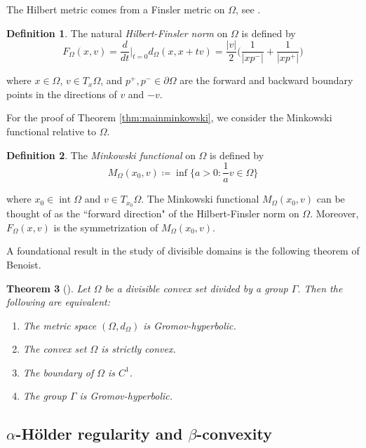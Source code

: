 \documentclass[letterpaper, 11pt, reqno]{amsart}
\newtheorem{thm}{Theorem}[section]
\theoremstyle{definition}
\newtheorem{dfn}[thm]{Definition}
\DeclareMathOperator{\interior}{int}
\begin{document}
The Hilbert metric comes from a Finsler metric on $\Omega$, see \cite{Marquis}.

\begin{dfn}\label{def:finsler} The natural \textit{Hilbert-Finsler norm} on $\Omega$ is defined by
    \begin{equation}
            F_\Omega(x,v) = \frac{d}{dt} \biggr\rvert_{t = 0} d_\Omega (x, x+tv) = \frac{|v|}{2} \bigg( \frac{1}{|xp^-|} + \frac{1}{|xp^+|} \bigg)
\end{equation}

where $x \in \Omega$, $v \in T_x \Omega$, and $p^+, p^- \in \partial\Omega$ are the forward and backward boundary points in the directions of $v$ and $-v$.
\end{dfn}


For the proof of Theorem \ref{thm:mainminkowski}, we consider the Minkowski functional relative to $\Omega$.

\begin{dfn}\label{dfn:minkowski} The \textit{Minkowski functional} on $\Omega$ is defined by
\begin{equation}\label{equation:minfun}
    M_\Omega(x_0,v) \coloneq \inf \biggl\{a > 0: \frac{1}{a}v \in \Omega \biggr\}
\end{equation}
\end{dfn}
where $x_0 \in \interior \Omega$ and $v \in T_{x_0}\Omega$. The Minkowski functional $M_\Omega(x_0,v)$ can be thought of as the ``forward direction" of the Hilbert-Finsler norm on $\Omega$. Moreover, $F_\Omega(x,v)$ is the symmetrization of $M_\Omega(x_0, v)$.

A foundational result in the study of divisible domains is the following theorem of Benoist.

\begin{thm}[\cite{Benoist}]
   Let $\Omega$ be a divisible convex set divided by a group $\Gamma$. Then the following are equivalent:
   \begin{enumerate}
       \item The metric space $(\Omega,d_\Omega)$ is Gromov-hyperbolic.
       \item The convex set $\Omega$ is strictly convex.
       \item The boundary of $\Omega$ is $C^1$.
       \item The group $\Gamma$ is Gromov-hyperbolic.
   \end{enumerate}
\end{thm}

\subsection{$\alpha$-H{\"o}lder regularity and $\beta$-convexity} \hfill\\
\end{document}
